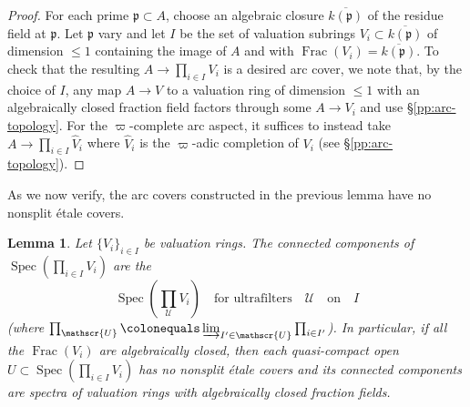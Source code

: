 \documentclass[11pt, reqno]{amsart}
\newcommand{\fp}{\mathfrak{p}}
\newcommand{\sU}{\mathscr{U}}
\DeclareMathOperator{\Frac}{Frac}		%
\DeclareMathOperator{\Spec}{Spec}		%
\newcommand{\ce}{\colonequals}
\newcommand{\ov}{\overline}
\newcommand{\ra}{\rightarrow}
\newcommand{\wh}{\widehat}
\providecommand{\up}[1]{{\upshape(}#1{\upshape)}}
\providecommand{\f}[2]{\frac{#1}{#2}}
\newcommand{\m}{\item}
\newcommand{\blem}{\begin{lemma}}
\newcommand{\elem}{\end{lemma}}
\newcommand{\benum}{\begin{enumerate}[label={{\upshape(\alph*)}}]}
\newcommand{\eenum}{\end{enumerate}}
\providecommand{\qxq}[1]{\quad\text{#1}\quad}
\newcommand{\tst}{\textstyle}
\newcommand{\bpf}{\begin{proof}}
\newcommand{\epf}{\end{proof}}
\numberwithin{equation}{numberingbase}
\theoremstyle{thms}
\newtheorem{lemma}[numberingbase]{Lemma}
\theoremstyle{claims}
\theoremstyle{defs}
\theoremstyle{thms}
\theoremstyle{defs}
\theoremstyle{subsection-tweak}
\theoremstyle{subsection-tweak}
\begin{document}
\bpf %
For each prime $\fp \subset A$, choose an algebraic closure $\ov{k(\fp)}$ of the residue field at $\fp$. Let $\fp$ vary and let $I$ be the set of valuation subrings $V_i \subset \ov{k(\fp)}$ of dimension $\le 1$ containing the image of $A$ and with $\Frac(V_i) = \ov{k(\fp)}$. To check that the resulting $A \ra \prod_{i \in I} V_i$ is a desired arc cover, we note that, by the choice of $I$, any map $A \ra V$ to a valuation ring of dimension $\le 1$ with an algebraically closed fraction field factors through some $A \ra V_i$ and use \S\ref{pp:arc-topology}.
For the $\varpi$-complete arc aspect, it suffices to instead take  $A \ra \prod_{i \in I} \wh{V}_i$ where $\wh{V}_i$ is the $\varpi$-adic completion of $V_i$ (see \S\ref{pp:arc-topology}). %
\epf





As we now verify, the arc covers constructed in the previous lemma have no nonsplit \'{e}tale covers. 

\blem \label{lem:ultrafilters}
Let $\{V_i\}_{i \in I}$ be valuation rings. The connected components of $\Spec(\prod_{i \in I} V_i)$ are the 
\[
\tst \Spec(\prod_{\sU} V_i) \qxq{for ultrafilters} \sU \qxq{on} I
\]
\up{where $\prod_\sU \ce \varinjlim_{I' \in \sU} \prod_{i \in I'}$}. In particular, if all the $\Frac(V_i)$ are algebraically closed, then each quasi-compact open  $U \subset \Spec(\prod_{i \in I} V_i)$ has no nonsplit \'{e}tale covers and its connected components are spectra of valuation rings with algebraically closed fraction fields. %
\elem
\end{document}
